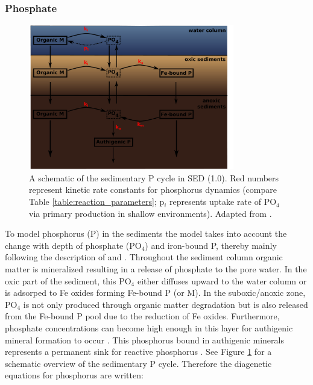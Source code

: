 \documentclass[gmd, manuscript]{copernicus}
\begin{document}
\subsubsection{Phosphate}
\begin{figure}[htbp]
\begin{center}
	\includegraphics[width=0.8\textwidth]{figures/P-cycle.pdf}
	\caption{A schematic of the sedimentary P cycle in SED (1.0). Red numbers represent kinetic rate constants for phosphorus dynamics (compare Table \ref{table:reaction_parameters}; p$_i$ represents uptake rate of PO$_4$ 
	via primary production in shallow environments). Adapted from \citet{caroline_p_slomp_key_1996}.}
	\label{fig:P-cycle}
	\end{center}
\end{figure}
To model phosphorus (P) in the sediments the model takes into account the change with depth of phosphate (PO$_4$) and iron-bound P, thereby mainly following the description of \citet{caroline_p_slomp_key_1996} 
and \citet{gypens_simple_2008}. Throughout the sediment column organic matter is mineralized resulting in a release of phosphate to the pore water. In the oxic part of the sediment, this PO$_4$ either 
diffuses upward to the water column or is adsorped to Fe oxides forming Fe-bound P (or M)\citep{slomp1998role}. In the suboxic/anoxic zone, PO$_4$ is not only produced through organic matter degradation but is 
also released from the Fe-bound P pool due to the reduction of Fe oxides. Furthermore, phosphate concentrations can become high enough in this layer for authigenic mineral formation to occur \citep{cappellen_mathematical_1988}. 
This phosphorus bound in authigenic minerals represents a permanent sink for reactive phosphorus \citep{caroline_p_slomp_key_1996}. See Figure \ref{fig:P-cycle} for a schematic overview of the sedimentary P cycle.
Therefore the diagenetic equations for phosphorus are written:
\end{document}
